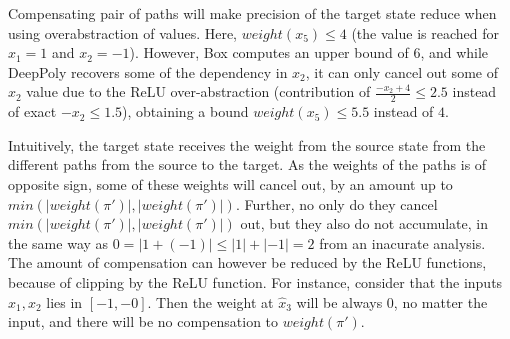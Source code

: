 \documentclass{llncs}
\newcommand{\ReLU}{\mathrm{ReLU}}
\begin{document}
Compensating pair of paths will make precision of the target state reduce when using overabstraction of values. Here, $weight(x_5) \leq 4$ (the value is reached for $x_1=1$ and $x_2=-1$). However, Box computes an upper bound of $6$, and while DeepPoly recovers some of the dependency in $x_2$, it can only cancel out some of $x_2$ value due to the ReLU over-abstraction (contribution of $\frac{-x_2+4}{2} \leq 2.5$ instead of exact $-x_2 \leq 1.5$), obtaining a bound $weight(x_5) \leq 5.5$ instead of $4$.

Intuitively, the target state receives the weight from the source state from the different paths from the source to the target. As the weights of the paths is of opposite sign, some of these weights will cancel out, by an amount up to $min(|weight(\pi')|,|weight(\pi')|)$. Further, no only do they cancel $min(|weight(\pi')|,|weight(\pi')|)$ out, but they also do not accumulate, in the same way as $0= |1+(-1)| \leq |1|+|-1|=2$ from an inacurate analysis. The amount of compensation can however be reduced by the ReLU functions, because of clipping by the ReLU function. For instance, consider that the inputs $x_1,x_2$ lies in $[-1,-0]$. Then the weight at $\hat{x}_3$ will be always 0, no matter the input, and there will be no compensation to $weight(\pi')$.




\iffalse
\vspace*{2ex}

\begin{figure}
\centering
{}
\end{figure}
\end{document}
